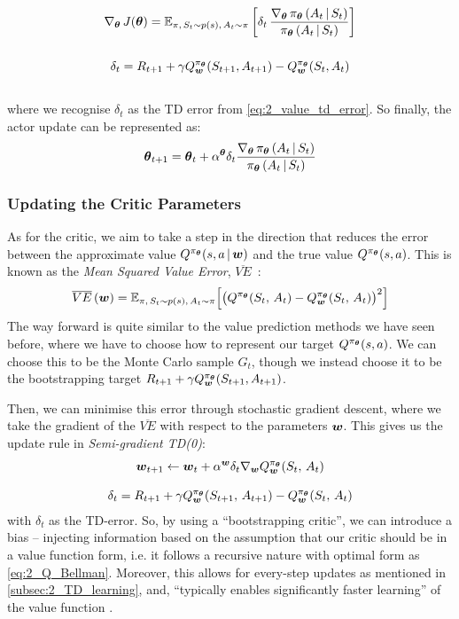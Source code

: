 \begin{gather}
    \nbt J(\bt) = \E_{\pi, \, S_t \sim p(s), \, A_t \sim \pi} \left[ \delta_t \,
    \frac{\nbt \pi_{\bt} \, (A_t \, | \, S_t)}{\pi_{\bt} \, (A_t \, | \, S_t)} \right]  \label{eq:2_actor_grad} \\[5mm]
    \delta_t = R_{t+1} + \gamma Q_{\bw}^{\pi_{\bt}}(S_{t+1}, A_{t+1}) - Q^{\pi_{\bt}}_{\bw}(S_t, A_t) \vspace{5mm} \label{eq:2_}
\end{gather}
where we recognise $\delta_t$ as the TD error from \eqref{eq:2_value_td_error}. So finally, the actor update can be represented as:
\begin{equation}
    \boldsymbol{\theta}_{t+1} = \boldsymbol{\theta}_t + \alpha^{\boldsymbol{\theta}} \delta_t \frac{\nabla_{\boldsymbol{\theta}} \, \pi_{\boldsymbol{\theta}} \, (A_t \, | \, S_t)}{\pi_{\boldsymbol{\theta}} \, (A_t \, | \, S_t)} \label{eq:2_actor_update}
\end{equation} 

\subsubsection{Updating the Critic Parameters}
As for the critic, we aim to take a step in the direction that reduces the error between the approximate value $Q^{\pi_{\boldsymbol{\theta}}}(s, a \,| \,\boldsymbol{w})$ and the true value $Q^{\pi_{\boldsymbol{\theta}}}(s,a)$. This is known as the \textit{Mean Squared Value Error}, $\overline{VE}\,$  \cite{suttonAndBartoBook}:
\begin{equation}
    \overline{VE}\,(\boldsymbol{w})= \mathbb{E}_{\pi, \, S_t \sim p(s), \, A_t \sim \pi} \Big[ 
    \big( Q^{\pi_{\boldsymbol{\theta}}}(S_t, \, A_t) - Q^{\pi_{\boldsymbol{\theta}}}_{\boldsymbol{w}}(S_t, \, A_t) \label{eq:2_critic_loss} \big)^2
    \Big]
\end{equation}
The way forward is quite similar to the value prediction methods we have seen before, where we have to choose how to represent our target $Q^{\pi_{\boldsymbol{\theta}}}(s,a)$. We can choose this to be the Monte Carlo sample $G_t$, though we instead choose it to be the bootstrapping target $R_{t+1} + \gamma Q_{\boldsymbol{w}}^{\pi_{\boldsymbol{\theta}}}(S_{t+1}, A_{t+1})$.

Then, we can minimise this error through stochastic gradient descent, where we take the gradient of the $\overline{VE}$ with respect to the parameters $\boldsymbol{w}$. This gives us the update rule in \textit{Semi-gradient TD(0)}:
\begin{gather}
    \boldsymbol{w}_{t+1} \leftarrow \boldsymbol{w}_{t} + \alpha^{\boldsymbol{w}} \delta_t \nabla_{\boldsymbol{w}} Q_{\boldsymbol{w}}^{\pi_{\boldsymbol{\theta}}} (S_t, \,A_t) \label{eq:2_critic_update} \\[3mm]
    \delta_t = R_{t+1} + \gamma Q_{\boldsymbol{w}}^{\pi_{\boldsymbol{\theta}}}(S_{t+1}, \,A_{t+1}) -Q_{\boldsymbol{w}}^{\pi_{\boldsymbol{\theta}}} (S_t, \,A_t) 
    \label{eq:2_value_td_error}
\end{gather}
with $\delta_t$ as the TD-error. So, by using a ``bootstrapping critic'', we can introduce a bias -- injecting information based on the assumption that our critic should be in a value function form, i.e. it follows a recursive nature with optimal form as \eqref{eq:2_Q_Bellman}. Moreover, this allows for every-step updates as mentioned in \cref{subsec:2_TD_learning}, and, ``typically enables significantly faster learning'' of the value function \cite{suttonAndBartoBook}. 

